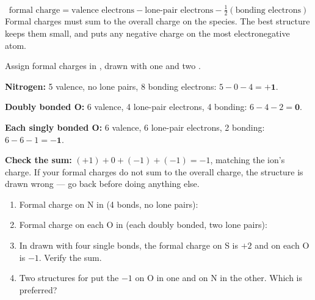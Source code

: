 \documentclass{apchem-worksheet}
\begin{document}
\[ \text{formal charge} = \text{valence electrons} -
   \text{lone-pair electrons} - \tfrac{1}{2}(\text{bonding electrons}) \]
Formal charges must sum to the overall charge on the species. The best
structure keeps them small, and puts any negative charge on the most
electronegative atom.

\begin{workedexample}[I do: nitrate]
Assign formal charges in , drawn with one  and two
.

\textbf{Nitrogen:} 5 valence, no lone pairs, 8 bonding electrons:
$5 - 0 - 4 = \mathbf{+1}$.

\textbf{Doubly bonded O:} 6 valence, 4 lone-pair electrons, 4 bonding:
$6 - 4 - 2 = \mathbf{0}$.

\textbf{Each singly bonded O:} 6 valence, 6 lone-pair electrons, 2
bonding: $6 - 6 - 1 = \mathbf{-1}$.

\textbf{Check the sum:} $(+1) + 0 + (-1) + (-1) = -1$, matching the ion's
charge. \checkmark If your formal charges do not sum to the overall
charge, the structure is drawn wrong --- go back before doing anything
else.
\end{workedexample}

\begin{yourturn}
\begin{enumerate}[leftmargin=*,itemsep=0.5em]
  \item Formal charge on N in  (4 bonds, no lone pairs):
        \workspace[1.4cm]
  \item Formal charge on each O in  (each doubly bonded, two lone
        pairs): \workspace[1.4cm]
  \item In  drawn with four single bonds, the formal charge on
        S is $+2$ and on each O is $-1$. Verify the sum.
        \workspace[1.6cm]
  \item Two structures for  put the $-1$ on O in one and on N in
        the other. Which is preferred? \workspace[1.8cm]
\end{enumerate}
\end{yourturn}
\end{document}

